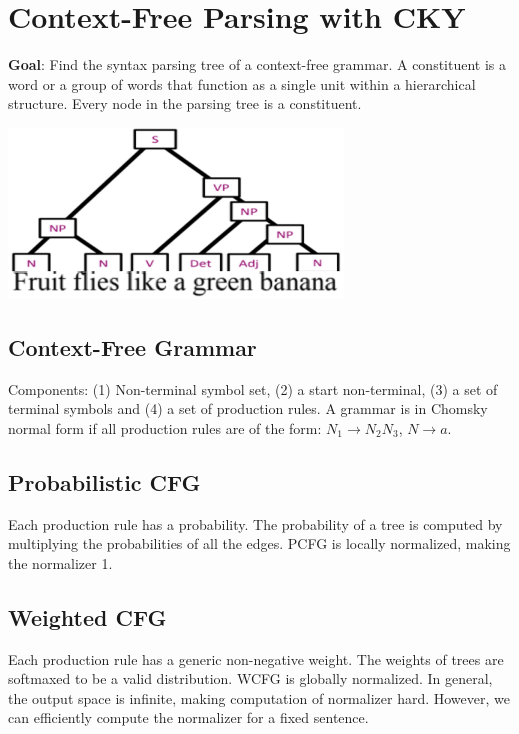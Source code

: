 \section{Context-Free Parsing with CKY}

\textbf{Goal}: Find the syntax parsing tree of a context-free grammar. A constituent is a word or a group of words that function as a single unit within a hierarchical structure. Every node in the parsing tree is a constituent.
\vspace{-0.4cm}
\begin{center}
    \includegraphics[width=.45\columnwidth]{img/syntex-tree.png}
\end{center}
\vspace{-0.4cm}
\subsection*{Context-Free Grammar}

Components: (1) Non-terminal symbol set, (2) a start non-terminal, (3) a set of terminal symbols and (4) a set of production rules.
A grammar is in Chomsky normal form if all production rules are of the form: $N_1\rightarrow N_2 N_3$, $N\rightarrow a$.

\subsection*{Probabilistic CFG}

Each production rule has a probability. The probability of a tree is computed by multiplying the probabilities of all the edges. PCFG is locally normalized, making the normalizer 1.

\subsection*{Weighted CFG}

Each production rule has a generic non-negative weight. The weights of trees are softmaxed to be a valid distribution. WCFG is globally normalized. In general, the output space is infinite, making computation of normalizer hard. However, we can efficiently compute the normalizer for a fixed sentence.

